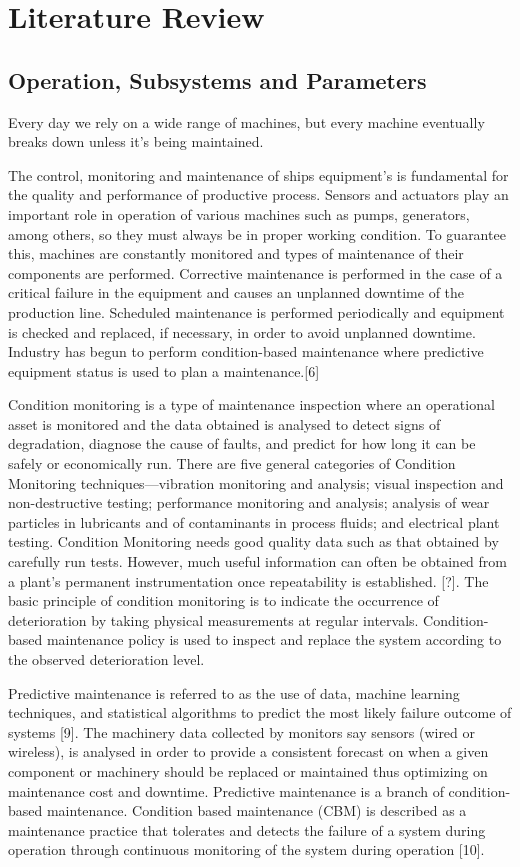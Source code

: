 \section{Literature Review}
\subsection{Operation, Subsystems and Parameters}
Every day we rely on a wide range of machines, but every machine eventually breaks down unless it’s being maintained.  

The control, monitoring and maintenance of ships equipment's is fundamental for the quality and performance of productive process. Sensors and actuators play an important role in operation of various machines such as pumps, generators, among others, so they must always be in proper working condition. To guarantee this, machines are constantly monitored and types of maintenance of their components are performed. Corrective maintenance is performed in the case of a critical failure in the equipment and causes an unplanned downtime of the production line. Scheduled maintenance is performed periodically and equipment is checked and replaced, if necessary, in order to avoid unplanned downtime. Industry has begun to perform condition-based maintenance where predictive equipment status is used to plan a maintenance.[6]  

Condition monitoring is a type of maintenance inspection where an operational asset is monitored and the data obtained is analysed to detect signs of degradation, diagnose the cause of faults, and predict for how long it can be safely or economically run. There are five general categories of Condition Monitoring techniques—vibration monitoring and analysis; visual inspection and non-destructive testing; performance monitoring and analysis; analysis of wear particles in lubricants and of contaminants in process fluids; and electrical plant testing. Condition Monitoring needs good quality data such as that obtained by carefully run tests. However, much useful information can often be obtained from a plant’s permanent instrumentation once repeatability is established. [?]. The basic principle of condition monitoring is to indicate the occurrence of deterioration by taking physical measurements at regular intervals. Condition-based maintenance policy is used to inspect and replace the system according to the observed deterioration level. 

Predictive maintenance is referred to as the use of data, machine learning techniques, and statistical algorithms to predict the most likely failure outcome of systems [9]. The machinery data collected by monitors say sensors (wired or wireless), is analysed in order to provide a consistent forecast on when a given component or machinery should be replaced or maintained thus optimizing on maintenance cost and downtime. Predictive maintenance is a branch of condition-based maintenance. Condition based maintenance (CBM) is described as a maintenance practice that tolerates and detects the failure of a system during operation through continuous monitoring of the system during operation [10]. 

